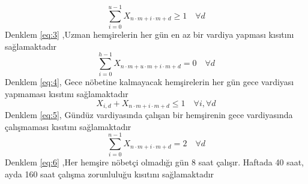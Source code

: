 \documentclass[12pt, a4paper]{article}
\begin{document}
\begin{flushleft}
\begin{equation}
	\label{eq:3}
	\sum_{i=0}^{u-1} X_{n \cdot m + i \cdot m + d} \geq 1 \quad \forall d
\end{equation}
Denklem  \ref{eq:3} ,Uzman hemşirelerin her gün en az bir vardiya yapması kısıtını sağlamaktadır  \\[10pt]
\begin{equation}
	\label{eq:4}
	\sum_{i=0}^{h-1} X_{n \cdot m + u \cdot m + i \cdot m + d} = 0 \quad \forall d
\end{equation}
Denklem  \ref{eq:4}, Gece nöbetine kalmayacak hemşirelerin her gün gece vardiyası yapmaması kısıtını sağlamaktadır \\[10pt]
\begin{equation}
	\label{eq:5}
	X_{i,d} + X_{n \cdot m + i \cdot m + d} \leq 1 \quad \forall i, \forall d
\end{equation}
Denklem  \ref{eq:5}, Gündüz vardiyasında çalışan bir hemşirenin gece vardiyasında çalışmaması kısıtını sağlamaktadır  \\[10pt]
\begin{equation}
	\label{eq:6}
	\sum_{i=0}^{n-1} X_{n \cdot m + i \cdot m + d} = 2 \quad \forall d
\end{equation}
Denklem \ref{eq:6} ,Her hemşire nöbetçi olmadığı gün 8 saat çalışır. Haftada 40 saat, ayda 160 saat çalışma zorunluluğu kısıtını sağlamaktadır  \\[10pt]


\end{flushleft}
\end{document}
